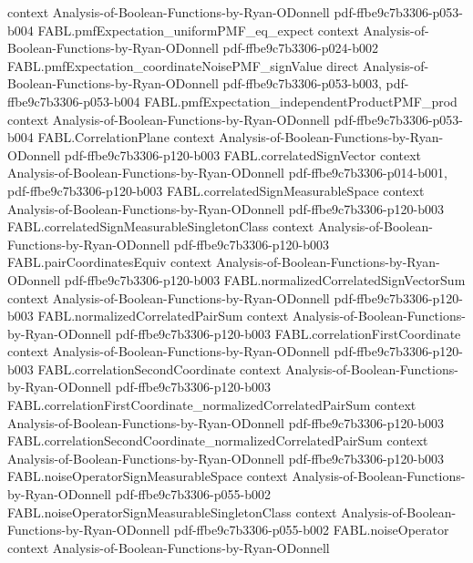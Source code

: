 \begin{theorem}
  {context}
  {Analysis-of-Boolean-Functions-by-Ryan-ODonnell}
  {pdf-ffbe9c7b3306-p053-b004}
\proofstep
  {FABL.pmfExpectation_uniformPMF_eq_expect}
  {context}
  {Analysis-of-Boolean-Functions-by-Ryan-ODonnell}
  {pdf-ffbe9c7b3306-p024-b002}
\proofstep
  {FABL.pmfExpectation_coordinateNoisePMF_signValue}
  {direct}
  {Analysis-of-Boolean-Functions-by-Ryan-ODonnell}
  {pdf-ffbe9c7b3306-p053-b003,
    pdf-ffbe9c7b3306-p053-b004}
\proofstep
  {FABL.pmfExpectation_independentProductPMF_prod}
  {context}
  {Analysis-of-Boolean-Functions-by-Ryan-ODonnell}
  {pdf-ffbe9c7b3306-p053-b004}
\proofstep
  {FABL.CorrelationPlane}
  {context}
  {Analysis-of-Boolean-Functions-by-Ryan-ODonnell}
  {pdf-ffbe9c7b3306-p120-b003}
\proofstep
  {FABL.correlatedSignVector}
  {context}
  {Analysis-of-Boolean-Functions-by-Ryan-ODonnell}
  {pdf-ffbe9c7b3306-p014-b001,
    pdf-ffbe9c7b3306-p120-b003}
\proofstep
  {FABL.correlatedSignMeasurableSpace}
  {context}
  {Analysis-of-Boolean-Functions-by-Ryan-ODonnell}
  {pdf-ffbe9c7b3306-p120-b003}
\proofstep
  {FABL.correlatedSignMeasurableSingletonClass}
  {context}
  {Analysis-of-Boolean-Functions-by-Ryan-ODonnell}
  {pdf-ffbe9c7b3306-p120-b003}
\proofstep
  {FABL.pairCoordinatesEquiv}
  {context}
  {Analysis-of-Boolean-Functions-by-Ryan-ODonnell}
  {pdf-ffbe9c7b3306-p120-b003}
\proofstep
  {FABL.normalizedCorrelatedSignVectorSum}
  {context}
  {Analysis-of-Boolean-Functions-by-Ryan-ODonnell}
  {pdf-ffbe9c7b3306-p120-b003}
\proofstep
  {FABL.normalizedCorrelatedPairSum}
  {context}
  {Analysis-of-Boolean-Functions-by-Ryan-ODonnell}
  {pdf-ffbe9c7b3306-p120-b003}
\proofstep
  {FABL.correlationFirstCoordinate}
  {context}
  {Analysis-of-Boolean-Functions-by-Ryan-ODonnell}
  {pdf-ffbe9c7b3306-p120-b003}
\proofstep
  {FABL.correlationSecondCoordinate}
  {context}
  {Analysis-of-Boolean-Functions-by-Ryan-ODonnell}
  {pdf-ffbe9c7b3306-p120-b003}
\proofstep
  {FABL.correlationFirstCoordinate_normalizedCorrelatedPairSum}
  {context}
  {Analysis-of-Boolean-Functions-by-Ryan-ODonnell}
  {pdf-ffbe9c7b3306-p120-b003}
\proofstep
  {FABL.correlationSecondCoordinate_normalizedCorrelatedPairSum}
  {context}
  {Analysis-of-Boolean-Functions-by-Ryan-ODonnell}
  {pdf-ffbe9c7b3306-p120-b003}
\proofstep
  {FABL.noiseOperatorSignMeasurableSpace}
  {context}
  {Analysis-of-Boolean-Functions-by-Ryan-ODonnell}
  {pdf-ffbe9c7b3306-p055-b002}
\proofstep
  {FABL.noiseOperatorSignMeasurableSingletonClass}
  {context}
  {Analysis-of-Boolean-Functions-by-Ryan-ODonnell}
  {pdf-ffbe9c7b3306-p055-b002}
\proofstep
  {FABL.noiseOperator}
  {context}
  {Analysis-of-Boolean-Functions-by-Ryan-ODonnell}

\end{theorem}

